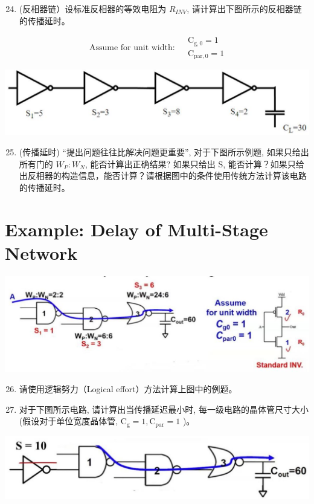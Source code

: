 \documentclass[10pt]{article}
\begin{document}
\begin{enumerate}
  \setcounter{enumi}{23}
  \item (反相器链）设标准反相器的等效电阻为 $R_{I N V}$, 请计算出下图所示的反相器链的传播延时。
\end{enumerate}

$$
\text { Assume for unit width: } \begin{aligned}
& \mathrm{C}_{\mathrm{g}, 0}=1 \\
& \mathrm{C}_{\mathrm{par}, 0}=1
\end{aligned}
$$

\begin{center}
\includegraphics[max width=\textwidth]{2024_05_20_f1af48ad54173fe448ecg-7}
\end{center}

\begin{enumerate}
  \setcounter{enumi}{24}
  \item (传播延时) “提出问题往往比解决问题更重要”, 对于下图所示例题, 如果只给出所有门的 $W_{P}: W_{N}$, 能否计算出正确结果? 如果只给出 $\mathrm{S}$, 能否计算？如果只给出反相器的构造信息，能否计算？请根据图中的条件使用传统方法计算该电路的传播延时。
\end{enumerate}

\section*{Example: Delay of Multi-Stage Network}
\begin{center}
\includegraphics[max width=\textwidth]{2024_05_20_f1af48ad54173fe448ecg-8(1)}
\end{center}

\begin{enumerate}
  \setcounter{enumi}{25}
  \item 请使用逻辑努力（Logical effort）方法计算上图中的例题。

  \item 对于下图所示电路, 请计算出当传播延迟最小时, 每一级电路的晶体管尺寸大小 (假设对于单位宽度晶体管, $\mathrm{C}_{\mathrm{g}}=1, \mathrm{C}_{\mathrm{par}}=1$ )。

\end{enumerate}

\begin{center}
\includegraphics[max width=\textwidth]{2024_05_20_f1af48ad54173fe448ecg-8}
\end{center}
\end{document}

